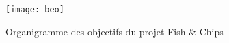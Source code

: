 

\begin{figure}[htp]
	\centering
	\caption{Organigramme des objectifs du projet Fish \& Chips}
	\label{f:beo_organig}
	\texttt{[image: beo]}
\end{figure}